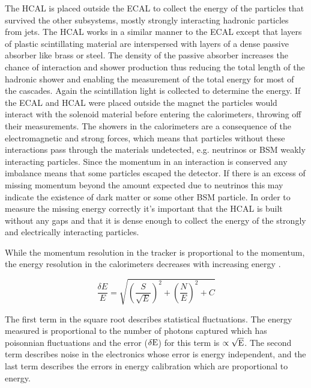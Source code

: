 The HCAL is placed outside the ECAL to collect the energy of the particles that survived the other subsystems, mostly strongly interacting hadronic particles from jets. The HCAL works in a similar manner to the ECAL except that layers of plastic scintillating material are interspersed with layers of a dense passive absorber like brass or steel. The density of the passive absorber increases the chance of interaction and shower production thus reducing the total length of the hadronic shower and enabling the measurement of the total energy for most of the cascades. Again the scintillation light is collected to determine the energy. If the ECAL and HCAL were placed outside the magnet the particles would interact with the solenoid material before entering the calorimeters, throwing off their measurements. The showers in the calorimeters are a consequence of the electromagnetic and strong forces, which means that particles without these interactions pass through the materials undetected, e.g. neutrinos or BSM weakly interacting particles. Since the momentum in an interaction is conserved any imbalance means that some particles escaped the detector. If there is an excess of missing momentum beyond the amount expected due to neutrinos this may indicate the existence of dark matter or some other BSM particle. In order to measure the missing energy correctly it's important that the HCAL is built without any gaps and that it is dense enough to collect the energy of the strongly and electrically interacting particles.

While the momentum resolution in the tracker is proportional to the momentum, the energy resolution in the calorimeters decreases with increasing energy \cite{pdgreview}.

\begin{equation}
\frac{\delta E}{E} = \sqrt{\left(\frac{S}{\sqrt{E}}\right)^2 + \left(\frac{N}{E}\right)^2 + C}
\end{equation}

The first term in the square root describes statistical fluctuations. The energy measured is proportional to the number of photons captured which has poisonnian fluctuations and the error (${\rm \delta E}$) for this term is $\propto \sqrt{{\rm E}}$. The second term describes noise in the electronics whose error is energy independent, and the last term describes the errors in energy calibration which are proportional to energy.

